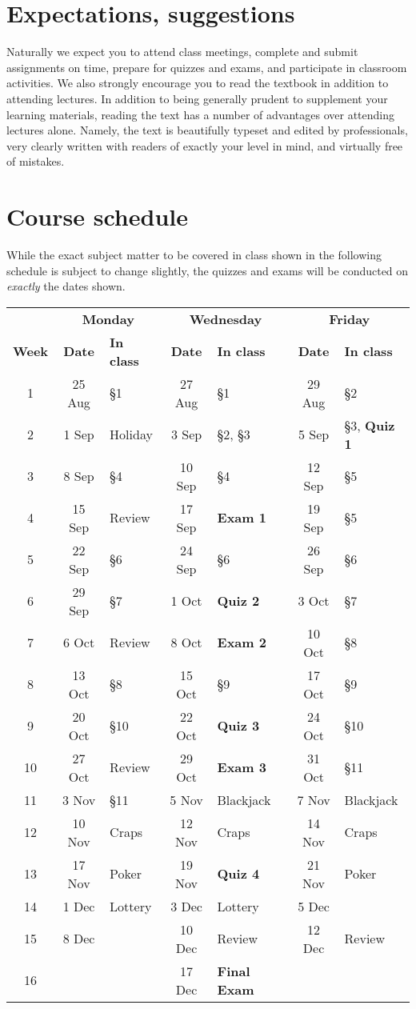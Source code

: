 \documentclass[11pt]{article}
\begin{document}
\section{Expectations, suggestions} Naturally we expect you to attend 
class meetings, complete and submit assignments on 
time, prepare for quizzes and exams, and participate in classroom 
activities. We also strongly encourage you to read the textbook
in addition to attending lectures.
In addition to being generally prudent to 
supplement your learning materials, reading the text has a number of 
advantages over attending lectures alone. Namely, the text is beautifully 
typeset and edited by professionals, very clearly written with readers 
of exactly your level in mind, and virtually free of mistakes.

\section{Course schedule}\label{Schedule} While the exact subject
matter to be covered in class shown in the following schedule is
subject to change slightly, the quizzes and exams will be conducted
on {\em exactly} the dates shown.

\begin{tabular}{c|cl|cl|cl}
&\multicolumn{2}{c|}{\bf Monday}
&\multicolumn{2}{c|}{\bf Wednesday}
&\multicolumn{2}{c}{\bf Friday}\\
{\bf Week}&{\bf Date}&{\bf In class}
&{\bf Date}&{\bf In class}&{\bf Date}&{\bf In class}\\\toprule
1&25 Aug&\S1&27 Aug&\S1&29 Aug&\S2\\\midrule
2&1 Sep&Holiday&3 Sep&\S2, \S3&5 Sep&\S3, {\bf Quiz 1}\\\midrule
3&8 Sep&\S4&10 Sep&\S4&12 Sep&\S5\\\midrule
4&15 Sep&Review&17 Sep&{\bf Exam 1}&19 Sep&\S5\\\midrule
5&22 Sep&\S6&24 Sep&\S6&26 Sep&\S6\\\midrule
6&29 Sep&\S7&1 Oct&{\bf Quiz 2}&3 Oct&\S7\\\midrule
7&6 Oct&Review&8 Oct&{\bf Exam 2}&10 Oct&\S8\\\midrule
8&13 Oct&\S8&15 Oct&\S9&17 Oct&\S9\\\midrule
9&20 Oct&\S10&22 Oct&{\bf Quiz 3}&24 Oct&\S10\\\midrule
10&27 Oct&Review&29 Oct&{\bf Exam 3}&31 Oct&\S11\\\midrule
11&3 Nov&\S11&5 Nov&Blackjack&7 Nov&Blackjack\\\midrule
12&10 Nov&Craps&12 Nov&Craps&14 Nov&Craps\\\midrule
13&17 Nov&Poker&19 Nov&{\bf Quiz 4}&21 Nov&Poker\\\midrule
14&1 Dec&Lottery&3 Dec&Lottery&5 Dec&\\\midrule
15&8 Dec&&10 Dec&Review&12 Dec&Review\\\midrule
16&&&17 Dec&{\bf Final Exam}&&
\end{tabular}
\end{document}
